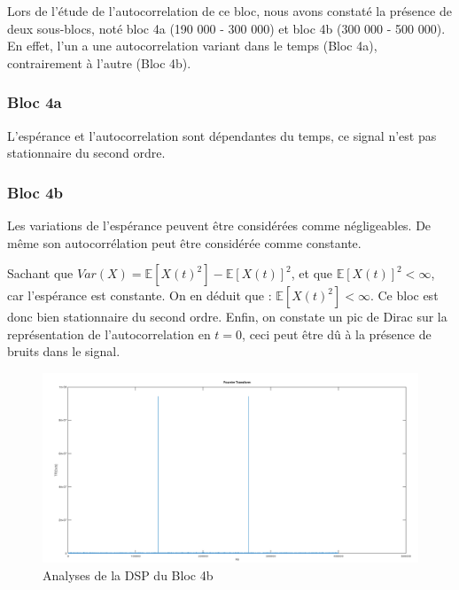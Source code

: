 \documentclass[french, a4paper, 12pt, openany]{book}
\begin{document}
	Lors de l'étude de l'autocorrelation de ce bloc, nous avons constaté la présence de deux sous-blocs, noté bloc 4a (190 000 - 300 000) et bloc 4b (300 000 - 500 000). En effet, l'un a une autocorrelation variant dans le temps (Bloc 4a), contrairement à l'autre (Bloc 4b).

	\subsubsection{Bloc 4a}
	L'espérance et l'autocorrelation sont dépendantes du temps, ce signal n'est pas stationnaire du second ordre.

	\subsubsection{Bloc 4b}
	Les variations de l'espérance peuvent être considérées comme négligeables. De même son autocorrélation peut être considérée comme constante.

Sachant que \begin{math}Var(X) = \mathbb{E}[X(t)^2] - \mathbb{E}[X(t)]^2\end{math}, et que \begin{math}\mathbb{E}[X(t)]^2<\infty\end{math}, car l'espérance est constante. On en déduit que : \begin{math}\mathbb{E}[X(t)^2]<\infty\end{math}. Ce bloc est donc bien stationnaire du second ordre.
Enfin, on constate un pic de Dirac sur la représentation de l'autocorrelation en \(t = 0\), ceci peut être dû à la présence de bruits dans le signal.

	\begin{figure}[ht]
		\begin{center}
		\includegraphics[scale=0.25]{images/DSPBloc4-2.png}
		\end{center}
		\caption{Analyses de la DSP du Bloc 4b}
		\label{Analyses de la DSP du Bloc 4b}
	\end{figure}
\end{document}
